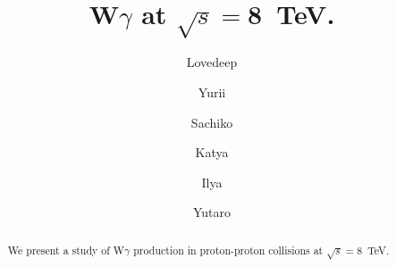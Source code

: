 \documentclass{article}
\begin{document}
 
\pagestyle{empty}
\pagenumbering{}
\title{\textbf{W$\gamma$ at $\sqrt{s}=$8~TeV.}}

\author[1]{Lovedeep}
\author[1]{Yurii}
\author[1]{Sachiko}
\author[2]{Katya}
\author[2]{Ilya}
\author[3]{Yutaro}

\maketitle

\begin{abstract}
We present a study of W$\gamma$ production in proton-proton
collisions at $\sqrt{s} = 8$~TeV. 
\end{abstract}

\thispagestyle{empty}
\newpage



\pagestyle{fancy}
\fancyhf{}
\lhead[]{\thepage}
\rhead[\thepage]{}

\tableofcontents

%
\linenumbers
\clearpage








\appendix

\clearpage
\end{document}
